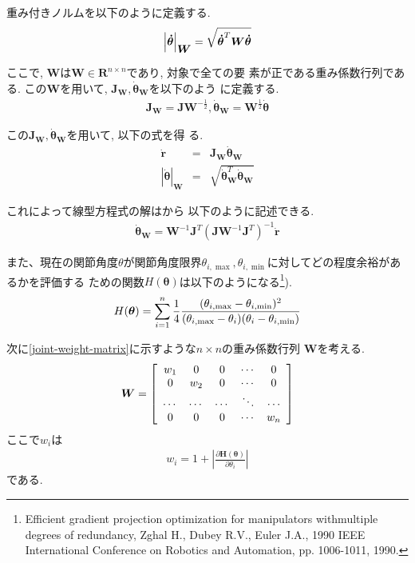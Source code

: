 重み付きノルムを以下のように定義する.
\begin{eqnarray}
 \left|\bm{\dot{\theta}}\right|_{\bm{W}} =
  \sqrt{\bm{\dot{\theta}}^T\bm{W}\bm{\dot{\theta}}}
  \eqlabel{weighted-norm}
\end{eqnarray}

ここで, $\bm{W}$は$\bm{W} \in \bm{R}^{n \times n}$であり, 対象で全ての要
素が正である重み係数行列である.
この$\bm{W}$を用いて, $\bm{J}_{\bm{W}}, \bm{\dot{\theta}}_{\bm{W}}$を以下のよう
に定義する.
\begin{eqnarray}
 \bm{J}_{\bm{W}} = \bm{J}\bm{W}^{-\frac{1}{2}},
  \bm{\dot{\theta}}_{\bm{W}} = \bm{W}^{\frac{1}{2}}\bm{\dot{\theta}}
\end{eqnarray}

この$\bm{J}_{\bm{W}}, \bm{\dot{\theta}}_{\bm{W}}$を用いて, 以下の式を得
る.
\begin{eqnarray}
 \dot{\bm{r}} & = & \bm{J}_{\bm{W}}\bm{\dot{\theta}}_{\bm{W}} \\
 \left|\dot{\bm{\theta}}\right|_{\bm{W}} & = & \sqrt{\bm{\dot{\theta}}_{\bm{W}}^T\bm{\dot{\theta}}_{\bm{W}}}
\end{eqnarray}


これによって線型方程式の解はから
以下のように記述できる.
\begin{eqnarray}
 \bm{\dot{\theta}}_{\bm{W}} = \bm{W}^{-1}\bm{J}^T
  \left(\bm{J}\bm{W}^{-1}\bm{J}^T\right)^{-1}\dot{\bm{r}}
\end{eqnarray}

また、現在の関節角度$\theta$が関節角度限界$\theta_{i,\max},
\theta_{i, \min}$に対してどの程度余裕があるかを評価する
ための関数$H(\bm{\theta})$は以下のようになる\footnote{
Efficient gradient projection optimization for manipulators
withmultiple degrees of redundancy,
Zghal H., Dubey R.V., Euler J.A.,
1990  IEEE International Conference on Robotics and Automation,
pp. 1006-1011, 1990.
}).
\begin{eqnarray}
 H(\bm{\theta}) = \sum_{i = 1}^n\frac{1}{4}
  \frac{(\theta_{i,\max} - \theta_{i,\min})^2}
  {(\theta_{i,\max} - \theta_i)(\theta_i - \theta_{i,\min})}
  \eqlabel{joint-performance-func}
\end{eqnarray}

次に\eqref{joint-weight-matrix}に示すような$n \times n$の重み係数行列
$\bm{W}$を考える.
\begin{eqnarray}
 \bm{W} = \left[
           \begin{array}{ccccc}
            w_1 & 0 & 0 & \cdots & 0 \\
            0 & w_2 & 0 & \cdots & 0 \\
            \cdots & \cdots  & \cdots & \ddots & \cdots \\
            0 & 0 & 0 & \cdots & w_n \\
           \end{array}
          \right]
 \eqlabel{joint-weight-matrix}
\end{eqnarray}
ここで$w_i$は
\begin{eqnarray}
 w_i = 1 + \left|\frac{\partial \bm{H}(\bm{\theta})}{\partial \theta_i}\right|
\end{eqnarray}
である.

